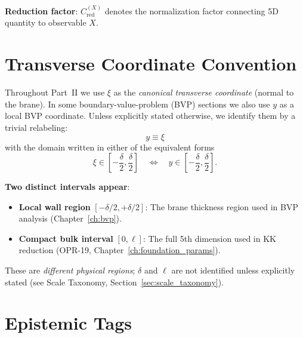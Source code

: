 \textbf{Reduction factor}: $C_{\text{red}}^{(X)}$ denotes the normalization
factor connecting 5D quantity to observable $X$.

\section{Transverse Coordinate Convention}
\label{sec:transverse_coord}

Throughout Part~II we use $\xi$ as the \emph{canonical transverse coordinate}
(normal to the brane). In some boundary-value-problem (BVP) sections we also
use $y$ as a local BVP coordinate. Unless explicitly stated otherwise, we
identify them by a trivial relabeling:
\begin{equation}
  \boxed{y \equiv \xi}
\end{equation}
with the domain written in either of the equivalent forms
\begin{equation}
  \xi \in \left[-\frac{\delta}{2},\frac{\delta}{2}\right]
  \quad \Longleftrightarrow \quad
  y \in \left[-\frac{\delta}{2},\frac{\delta}{2}\right].
\end{equation}

\textbf{Two distinct intervals appear}:
\begin{itemize}[nosep]
\item \textbf{Local wall region} $[-\delta/2, +\delta/2]$: The brane thickness
      region used in BVP analysis (Chapter~\ref{ch:bvp}).
\item \textbf{Compact bulk interval} $[0, \ell]$: The full 5th dimension used
      in KK reduction (OPR-19, Chapter~\ref{ch:foundation_params}).
\end{itemize}
These are \emph{different physical regions}; $\delta$ and $\ell$ are not
identified unless explicitly stated (see Scale Taxonomy,
Section~\ref{sec:scale_taxonomy}).

\section{Epistemic Tags}

